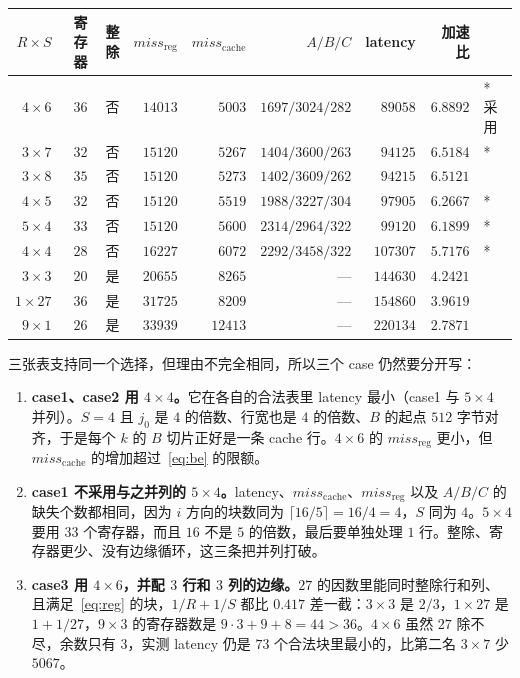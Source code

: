 \documentclass[11pt,a4paper,fontset=fandol]{ctexart}
\newcommand{\mreg}{\mathit{miss}_{\mathrm{reg}}}
\newcommand{\mc}{\mathit{miss}_{\mathrm{cache}}}
\begin{document}
\begin{center}
\label{tab:top3}
\small
\begin{tabular}{@{}rrrrrrrrl@{}}
\toprule
$R\times S$ & 寄存器 & 整除 & $\mreg$ & $\mc$ & $A/B/C$ & latency & 加速比 & \\
\midrule
$4\times6$ & $36$ & 否 & $14013$ & $5003$ & $1697/3024/282$ & $89058$ & $6.8892$ & * 采用\\
$3\times7$ & $32$ & 否 & $15120$ & $5267$ & $1404/3600/263$ & $94125$ & $6.5184$ & *\\
$3\times8$ & $35$ & 否 & $15120$ & $5273$ & $1402/3609/262$ & $94215$ & $6.5121$ & \\
$4\times5$ & $32$ & 否 & $15120$ & $5519$ & $1988/3227/304$ & $97905$ & $6.2667$ & *\\
$5\times4$ & $33$ & 否 & $15120$ & $5600$ & $2314/2964/322$ & $99120$ & $6.1899$ & *\\
$4\times4$ & $28$ & 否 & $16227$ & $6072$ & $2292/3458/322$ & $107307$ & $5.7176$ & *\\
$3\times3$ & $20$ & 是 & $20655$ & $8265$ & --- & $144630$ & $4.2421$ & \\
$1\times27$ & $36$ & 是 & $31725$ & $8209$ & --- & $154860$ & $3.9619$ & \\
$9\times1$ & $26$ & 是 & $33939$ & $12413$ & --- & $220134$ & $2.7871$ & \\
\bottomrule
\end{tabular}
\end{center}

三张表支持同一个选择，但理由不完全相同，所以三个 case 仍然要分开写：

\begin{enumerate}
  \item \textbf{case1、case2 用 $4\times4$。}它在各自的合法表里 latency 最小（case1 与 $5\times4$ 并列）。$S=4$ 且 $j_0$ 是 $4$ 的倍数、行宽也是 $4$ 的倍数、$B$ 的起点 $512$ 字节对齐，于是每个 $k$ 的 $B$ 切片正好是一条 cache 行。$4\times6$ 的 $\mreg$ 更小，但 $\mc$ 的增加超过~\eqref{eq:be} 的限额。
  \item \textbf{case1 不采用与之并列的 $5\times4$。}latency、$\mc$、$\mreg$ 以及 $A/B/C$ 的缺失个数都相同，因为 $i$ 方向的块数同为 $\lceil16/5\rceil=16/4=4$，$S$ 同为 $4$。$5\times4$ 要用 $33$ 个寄存器，而且 $16$ 不是 $5$ 的倍数，最后要单独处理 $1$ 行。整除、寄存器更少、没有边缘循环，这三条把并列打破。
  \item \textbf{case3 用 $4\times6$，并配 $3$ 行和 $3$ 列的边缘。}$27$ 的因数里能同时整除行和列、且满足~\eqref{eq:reg} 的块，$1/R+1/S$ 都比 $0.417$ 差一截：$3\times3$ 是 $2/3$，$1\times27$ 是 $1+1/27$，$9\times3$ 的寄存器数是 $9\cdot3+9+8=44>36$。$4\times6$ 虽然 $27$ 除不尽，余数只有 $3$，实测 latency 仍是 $73$ 个合法块里最小的，比第二名 $3\times7$ 少 $5067$。
\end{enumerate}
\end{document}
